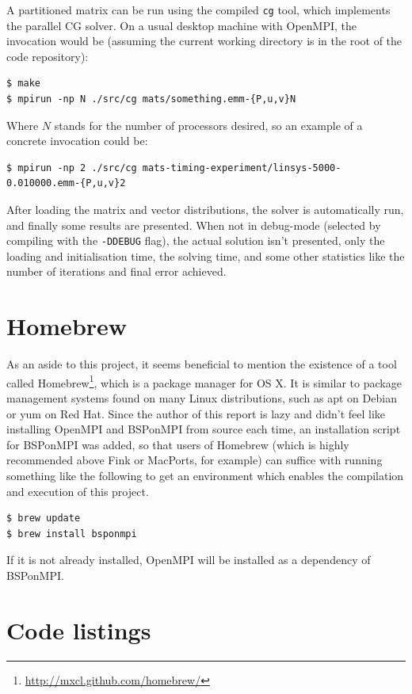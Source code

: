 \documentclass[a4paper]{article}
\begin{document}
A partitioned matrix can be run using the compiled \texttt{cg} tool, which implements the parallel CG solver. On
a usual desktop machine with OpenMPI, the invocation would be (assuming the current working directory is in
the root of the code repository):

\begin{verbatim}
$ make
$ mpirun -np N ./src/cg mats/something.emm-{P,u,v}N
\end{verbatim}

Where $N$ stands for the number of processors desired, so an example of a concrete invocation could be:
\begin{verbatim}
$ mpirun -np 2 ./src/cg mats-timing-experiment/linsys-5000-0.010000.emm-{P,u,v}2
\end{verbatim}

After loading the matrix and vector distributions, the solver is automatically
run, and finally some results are presented. When not in debug-mode (selected by compiling
with the \texttt{-DDEBUG} flag), the actual solution isn't presented, only the loading and
initialisation time, the solving time, and some other statistics like the number of iterations
and final error achieved.

\clearpage
\section{Homebrew}

As an aside to this project, it seems beneficial to mention the existence of a
tool called Homebrew\footnote{\url{http://mxcl.github.com/homebrew/}}, which is
a package manager for OS X. It is similar to package management systems found
on many Linux distributions, such as apt on Debian or yum on Red Hat. Since the
author of this report is lazy and didn't feel like installing OpenMPI and
BSPonMPI from source each time, an installation script for BSPonMPI was added,
so that users of Homebrew (which is highly recommended above Fink or MacPorts,
for example) can suffice with running something like the following to get an
environment which enables the compilation and execution of this project.

\begin{verbatim}
$ brew update
$ brew install bsponmpi
\end{verbatim}

If it is not already installed, OpenMPI will be installed as a dependency of BSPonMPI.

\section{Code listings}




\end{document}

